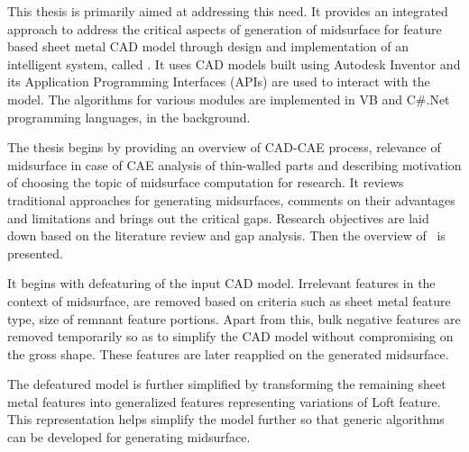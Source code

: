 This thesis is primarily aimed at addressing this need. It provides an integrated approach to address the critical aspects of generation of midsurface for feature based sheet metal CAD model through design and implementation of an intelligent system, called \mysystemname. It uses CAD models built using Autodesk Inventor and its Application Programming Interfaces (APIs) are used to interact with the model. The algorithms for various modules are implemented in VB and C\#.Net programming languages, in the background.
%

The thesis begins by providing an overview of CAD-CAE process, relevance of midsurface in case of CAE analysis of thin-walled parts and describing motivation of choosing the topic of midsurface computation for research. It reviews traditional approaches for generating midsurfaces, comments on their advantages and limitations and brings out the critical gaps. Research objectives are laid down based on the literature review and gap analysis. Then the overview of \mysystemname~is presented. 

It begins with defeaturing of the input CAD model. Irrelevant features in the context of midsurface, are removed based on criteria such as sheet metal feature type, size of remnant feature portions. Apart from this, bulk negative features are removed temporarily so as to simplify the CAD model without compromising on the gross shape. These features are later reapplied on the generated midsurface. 

The defeatured model is further simplified by transforming the remaining sheet metal features into generalized features representing variations of Loft feature. This representation helps simplify the model further so that generic algorithms can be developed for generating midsurface. 

